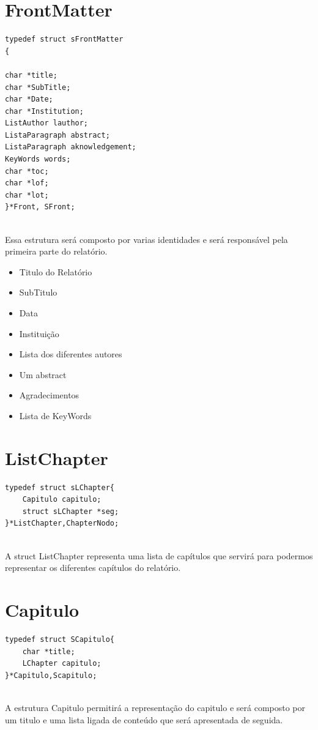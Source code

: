 \documentclass[12pt,a4paper]{report}
\begin{document}
\section{FrontMatter }
\begin{verbatim}
typedef struct sFrontMatter
{
    
char *title;
char *SubTitle;
char *Date;
char *Institution;
ListAuthor lauthor;
ListaParagraph abstract;
ListaParagraph aknowledgement;
KeyWords words;
char *toc;
char *lof;
char *lot;
}*Front, SFront; 
 
\end{verbatim}Essa estrutura será composto por varias identidades e será responsável pela primeira parte do relatório.  
\begin{itemize}\item Titulo do Relatório  \item SubTitulo \item Data \item Instituição \item Lista dos diferentes autores \item Um abstract  \item Agradecimentos  \item Lista de KeyWords  \end{itemize}\section{ListChapter }
\begin{verbatim}
typedef struct sLChapter{
    Capitulo capitulo;
    struct sLChapter *seg;
}*ListChapter,ChapterNodo;
 
\end{verbatim}A struct ListChapter representa uma lista de capítulos que servirá para podermos representar os diferentes capítulos do relatório. 
\section{Capitulo }
\begin{verbatim}
typedef struct SCapitulo{
    char *title;
    LChapter capitulo;
}*Capitulo,Scapitulo;
 
\end{verbatim}A estrutura Capitulo permitirá a representação do capitulo e será composto por um titulo e uma lista ligada de conteúdo que será apresentada de seguida. 
\end{document}
